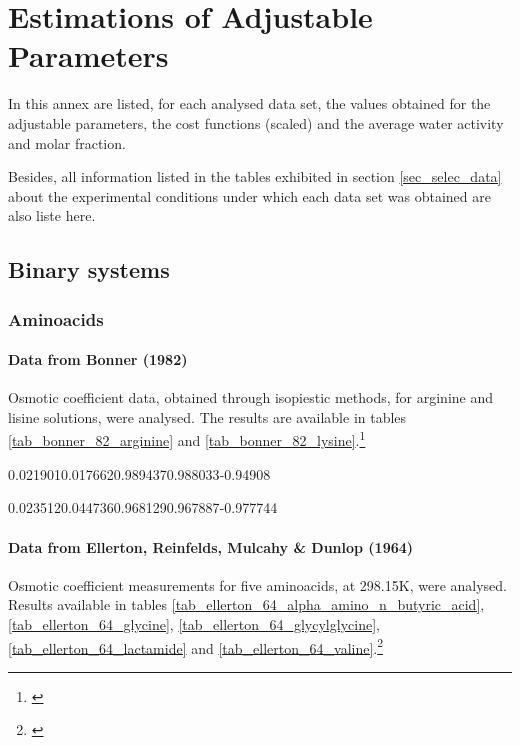 \partanexos

\chapter{Estimations of Adjustable Parameters}

In this annex are listed, for each analysed data set, the values obtained
for the adjustable parameters, the cost functions (scaled) and the average
water activity and molar fraction.

Besides, all information listed in the tables exhibited in section
\ref{sec_selec_data} about the experimental conditions under which each data
set was obtained are also liste here.

\section{Binary systems}

\subsection{Aminoacids}

\subsubsection{Data from Bonner (1982)}

Osmotic coefficient data, obtained through isopiestic methods, for arginine and
lisine solutions, were analysed. The results are available in tables
\ref{tab_bonner_82_arginine} and \ref{tab_bonner_82_lysine}.\footnote{%
\cite{bonner1982}}


%
	{0.021901}{0.017662}{0.989437}{0.988033}{-0.94908}

%
	{0.023512}{0.044736}{0.968129}{0.967887}{-0.977744}

\FloatBarrier

\subsubsection{Data from Ellerton, Reinfelds, Mulcahy \& Dunlop (1964)}

Osmotic coefficient measurements for five aminoacids, at 298.15K, were analysed.
Results available in tables
\ref{tab_ellerton_64_alpha_amino_n_butyric_acid}, \ref{tab_ellerton_64_glycine},
\ref{tab_ellerton_64_glycylglycine}, \ref{tab_ellerton_64_lactamide} and
\ref{tab_ellerton_64_valine}.\footnote{\cite{ellerton1964}}


